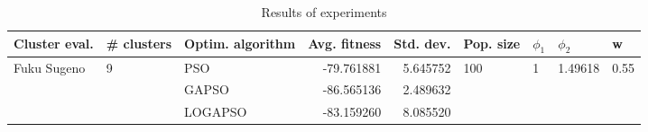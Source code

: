 \begin{table}
\centering
\caption{Results of experiments}
\begin{tabular}{lllrrllll}
\toprule
               Cluster eval. &        \# clusters & Optim. algorithm &  Avg. fitness &  Std. dev. &            Pop. size &         $\phi_{1}$ &               $\phi_{2}$ &                     w \\
\midrule
\multirow{3}{*}{Fuku Sugeno} & \multirow{3}{*}{9} &              PSO &    -79.761881 &   5.645752 & \multirow{3}{*}{100} & \multirow{3}{*}{1} & \multirow{3}{*}{1.49618} & \multirow{3}{*}{0.55} \\
                             &                    &            GAPSO &    -86.565136 &   2.489632 &                      &                    &                          &                       \\
                             &                    &          LOGAPSO &    -83.159260 &   8.085520 &                      &                    &                          &                       \\
\bottomrule
\end{tabular}
\end{table}
